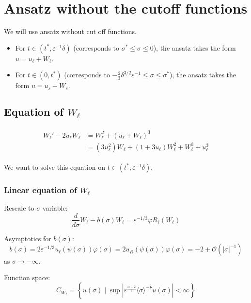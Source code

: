\documentclass[letterpaper,11pt]{article}
\newcommand{\rmO}{\mathcal{O}}
\newcommand{\eps}{\varepsilon}
\numberwithin{equation}{section}
\theoremstyle{plain}
\begin{document}
\section{Ansatz without the cutoff functions}
We will use ansatz without cut off functions.
\begin{itemize}
\item For $t \in (t^*, \eps^{-1}\delta)$ (corresponds to $ \sigma^*\le \sigma \le 0$), the ansatz takes the form $u = u_\ell  +W_\ell$.

\item For $t \in (0, t^* )$ (corresponds to $ -\frac{2}{3}\delta^{3/2}\eps^{-1}\le \sigma \le \sigma^*$), the ansatz takes the form $u = u_s  +W_s$.
\end{itemize}

\subsection{Equation of \texorpdfstring{$W_{\ell}$}{Well} }
\begin{align}
\begin{split}
W_{\ell}' -2u_\ell W_\ell &= W_\ell^2 + (u_\ell+W_\ell)^3
 \\
 &=  (3u_\ell^2)W_\ell + (1+3u_\ell)W_\ell^2 + W_\ell^3+u_\ell^3
\end{split}
\end{align}

We want to solve this equation on $t\in (t^*, \eps^{-1}\delta)$.

\subsubsection{Linear equation of \texorpdfstring{$W_{\ell}$}{Wl}}
Rescale to $\sigma$ variable:
\begin{equation}
\frac{d}{d\sigma} W_\ell - b(\sigma)W_\ell = \eps^{-1/3}\varphi R_\ell(W_\ell)
\end{equation}

Asymptotics for $b(\sigma)$:
\[
b(\sigma) = 2\eps^{-1/3}u_\ell(\psi(\sigma))\varphi(\sigma) = 2u_R(\psi(\sigma))\varphi(\sigma) = -2 + \rmO(|\sigma|^{-1})
\]
as $\sigma \to -\infty$.

Function space:
\[
C_{W_\ell} = \left\{ u(\sigma) \mid \sup |\eps^{\frac{\alpha-2}{3}}\langle\sigma \rangle^{-\frac{2}{3}} u(\sigma)|<\infty \right\}
\]

\end{document}
